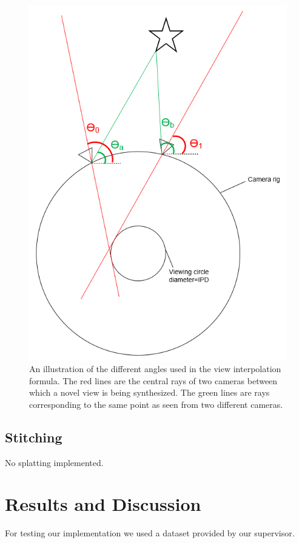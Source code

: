 \documentclass[10pt,twocolumn,letterpaper]{article}
\begin{document}
\begin{figure}[t]
\begin{center}
   \includegraphics[width=0.7\linewidth]{pictures/interpolation.PNG}
\end{center}
   \caption{An illustration of the different angles used in the view interpolation formula. The red lines are the central rays of two cameras between which a novel view is being synthesized. The green lines are rays corresponding to the same point as seen from two different cameras.}
\label{fig:interpolation}
\end{figure}

\subsection{Stitching}
No splatting implemented. 
\section{Results and Discussion}
\label{resultsdis}
For testing our implementation we used a dataset provided by our supervisor. 
\end{document}
